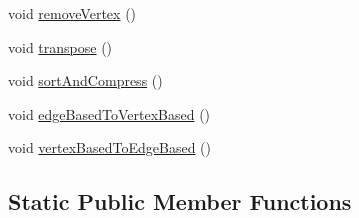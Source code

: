 \begin{DoxyCompactItemize}
\item 
void \mbox{\hyperlink{classUNAT_1_1Topology_a3116756821bb4fdedfe16f2f0256552c}{remove\+Vertex}} ()
\item 
void \mbox{\hyperlink{classUNAT_1_1Topology_aee69e4993644c249fdaaf55627309309}{transpose}} ()
\item 
void \mbox{\hyperlink{classUNAT_1_1Topology_a2293a4becd4f59f38364701e7ea7bf1d}{sort\+And\+Compress}} ()
\item 
void \mbox{\hyperlink{classUNAT_1_1Topology_aeac30ca87544104afb11344fdd5ac3a9}{edge\+Based\+To\+Vertex\+Based}} ()
\item 
void \mbox{\hyperlink{classUNAT_1_1Topology_a406ac8df118240b4245dac4e3d9ed634}{vertex\+Based\+To\+Edge\+Based}} ()
\end{DoxyCompactItemize}
\subsection*{Static Public Member Functions}

